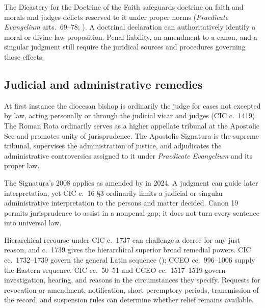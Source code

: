 The Dicastery for the Doctrine of the Faith safeguards doctrine on faith and morals and judges delicts reserved to it under proper norms (\emph{Praedicate Evangelium} arts.~69--78; ). A doctrinal declaration can authoritatively identify a moral or divine-law proposition. Penal liability, an amendment to a canon, and a singular judgment still require the juridical sources and procedures governing those effects.

\subsection{Judicial and administrative remedies}

At first instance the diocesan bishop is ordinarily the judge for cases not excepted by law, acting personally or through the judicial vicar and judges (CIC c.~1419). The Roman Rota ordinarily serves as a higher appellate tribunal at the Apostolic See and promotes unity of jurisprudence. The Apostolic Signatura is the supreme tribunal, supervises the administration of justice, and adjudicates the administrative controversies assigned to it under \emph{Praedicate Evangelium} and its proper law.

The Signatura's 2008  applies as amended by  in 2024. A judgment can guide later interpretation, yet CIC c.~16 \S3 ordinarily limits a judicial or singular administrative interpretation to the persons and matter decided. Canon 19 permits jurisprudence to assist in a nonpenal gap; it does not turn every sentence into universal law.

Hierarchical recourse under CIC c.~1737 can challenge a decree for any just reason, and c.~1739 gives the hierarchical superior broad remedial powers. CIC cc.~1732--1739 govern the general Latin sequence (); CCEO cc.~996--1006 supply the Eastern sequence. CIC cc.~50--51 and CCEO cc.~1517--1519 govern investigation, hearing, and reasons in the circumstances they specify. Requests for revocation or amendment, notification, short peremptory periods, transmission of the record, and suspension rules can determine whether relief remains available.

